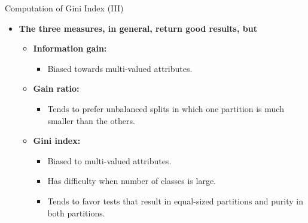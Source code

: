 \begin{frame}{Computation of Gini Index (III)}
	\begin{itemize}
		\item \textbf{The three measures, in general, return good results, but}
		      \begin{itemize}
			      \item \textbf{\color{airforceblue}Information gain:}
			            \begin{itemize}
				            \item Biased towards multi-valued attributes.
			            \end{itemize}
			      \item \textbf{\color{airforceblue}Gain ratio:}
			            \begin{itemize}
				            \item Tends to prefer unbalanced splits in which one partition is much smaller than the others.
			            \end{itemize}
			      \item \textbf{\color{airforceblue}Gini index:}
			            \begin{itemize}
				            \item Biased to multi-valued attributes.
				            \item Has difficulty when number of classes is large.
				            \item Tends to favor tests that result in equal-sized partitions and purity in both partitions.
			            \end{itemize}
		      \end{itemize}
	\end{itemize}
\end{frame}

